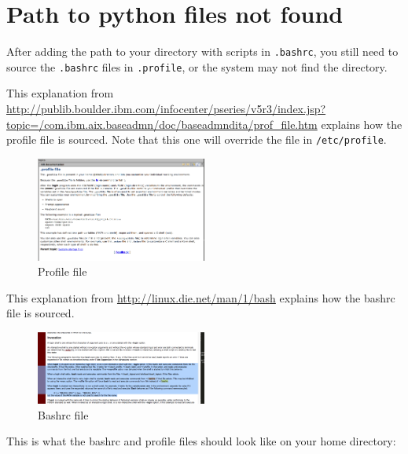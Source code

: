 \documentclass[letterpaper,10pt]{article}
\begin{document}

\section{Path to python files not found}


After adding the path to your directory with scripts in \verb".bashrc", you still need to source the \verb".bashrc" files in \verb".profile", or the system may not find the directory. 

This explanation from \url{http://publib.boulder.ibm.com/infocenter/pseries/v5r3/index.jsp?topic=/com.ibm.aix.baseadmn/doc/baseadmndita/prof_file.htm} explains how the profile file is sourced. Note that this one will override the file in \texttt{/etc/profile}.

\begin{figure}[h!]
  \centering
  \includegraphics[width=0.5\textwidth]{images/profile_file}
  \caption{Profile file}
  \label{fig:profile_file}
\end{figure}

This explanation from \url{http://linux.die.net/man/1/bash} explains how the bashrc file is sourced. 

\begin{figure}[h!]
  \centering
  \includegraphics[width=0.5\textwidth]{images/bashrc_file}
  \caption{Bashrc file}
  \label{fig:bashrc_file}
\end{figure}

This is what the bashrc and profile files should look like on your home directory:
\end{document}

